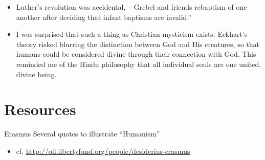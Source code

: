\begin{frame}[label=sec-3-7]{}
\begin{itemize}
\item Luther's revolution was accidental, -- Grebel and friends rebaptism of one another after deciding that infant baptisms are invalid.''

\item I was surprised that such a thing as Christian mysticism exists. Eckhart's theory risked blurring the distinction between God and His creatures, so that humans could be considered divine through their connection with God. This reminded me of the Hindu philosophy that all individual souls are one united, divine being.
\end{itemize}
\end{frame}

\section{Resources}
\label{sec-4}
\begin{frame}[label=sec-4-1]{Erasmus}
Several quotes to illustrate ``Humanism''

\begin{itemize}
\item cf. \url{http://oll.libertyfund.org/people/desiderius-erasmus}
\end{itemize}
\end{frame}

